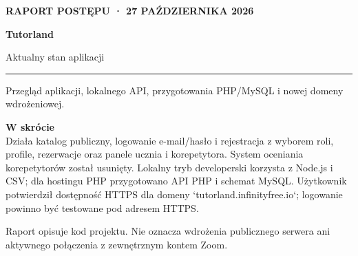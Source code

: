 \documentclass[10pt,a4paper]{article}
\begin{document}
\begin{titlepage}
\thispagestyle{empty}
\vspace*{32mm}
{\large\color{blue}\textbf{RAPORT POSTĘPU · 27 PAŹDZIERNIKA 2026}}
\vspace{12mm}
{\Huge\bfseries\color{navy}Tutorland\par}
\vspace{4mm}
{\LARGE Aktualny stan aplikacji\par}
\vspace{13mm}
\color{blue}\rule{\textwidth}{2pt}
\vspace{9mm}
{\large Przegląd aplikacji, lokalnego API, przygotowania PHP/MySQL i nowej domeny wdrożeniowej.}
\vfill
\colorbox{pale}{\parbox{\dimexpr\textwidth-2\fboxsep\relax}{\textbf{W skrócie}\\
Działa katalog publiczny, logowanie e-mail/hasło i rejestracja z wyborem roli, profile, rezerwacje oraz panele ucznia i korepetytora. System oceniania korepetytorów został usunięty. Lokalny tryb developerski korzysta z Node.js i CSV; dla hostingu PHP przygotowano API PHP i schemat MySQL. Użytkownik potwierdził dostępność HTTPS dla domeny `tutorland.infinityfree.io`; logowanie powinno być testowane pod adresem HTTPS.}}\par
\vspace{12mm}
{\small\color{muted}Raport opisuje kod projektu. Nie oznacza wdrożenia publicznego serwera ani aktywnego połączenia z zewnętrznym kontem Zoom.}
\end{titlepage}
\end{document}
